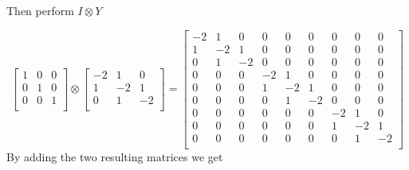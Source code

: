 \documentclass[authoryearcitations]{UoYCSproject}
\begin{document}
Then perform $I \otimes Y$

\begin{equation}
\begin{bmatrix}
  1 & 0 & 0 \\
  0 & 1 & 0 \\
  0 & 0 & 1 \\
\end{bmatrix} \otimes \begin{bmatrix}
                         -2 & 1 & 0 \\
                          1 & -2 & 1 \\
                          0 & 1 & -2 \\
                      \end{bmatrix} = \begin{bmatrix}
                                        -2 & 1 & 0 & 0 & 0 & 0 & 0 & 0 & 0 \\
                                        1 & -2 & 1 & 0 & 0 & 0 & 0 & 0 & 0 \\ 
                                        0 & 1 & -2 & 0 & 0 & 0 & 0 & 0 & 0 \\
                                        0 & 0 & 0 & -2 & 1 & 0 & 0 & 0 & 0 \\
                                        0 & 0 & 0 & 1 & -2 & 1 & 0 & 0 & 0 \\
                                        0 & 0 & 0 & 0 & 1 & -2 & 0 & 0 & 0 \\
                                        0 & 0 & 0 & 0 & 0 & 0 & -2 & 1 & 0 \\
                                        0 & 0 & 0 & 0 & 0 & 0 & 1 & -2 & 1 \\
                                        0 & 0 & 0 & 0 & 0 & 0 & 0 & 1 & -2 \\
                                      \end{bmatrix}
\label{eq:tensorExample2}
\end{equation}
By adding the two resulting matrices we get
\end{document}
